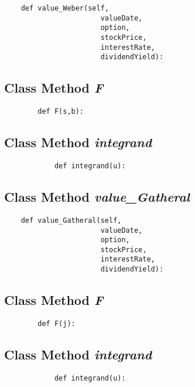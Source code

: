 \documentclass[twoside,11pt]{book}
\begin{document}
\begin{lstlisting}
    def value_Weber(self,
                       valueDate,
                       option,
                       stockPrice,
                       interestRate,
                       dividendYield):
\end{lstlisting}

\subsection{Class Method {\it F}}


\begin{lstlisting}
        def F(s,b):
\end{lstlisting}

\subsection{Class Method {\it integrand}}


\begin{lstlisting}
            def integrand(u):
\end{lstlisting}

\subsection{Class Method {\it value\_Gatheral}}


\begin{lstlisting}
    def value_Gatheral(self,
                       valueDate,
                       option,
                       stockPrice,
                       interestRate,
                       dividendYield):
\end{lstlisting}

\subsection{Class Method {\it F}}


\begin{lstlisting}
        def F(j):
\end{lstlisting}

\subsection{Class Method {\it integrand}}


\begin{lstlisting}
            def integrand(u):
\end{lstlisting}
\end{document}
